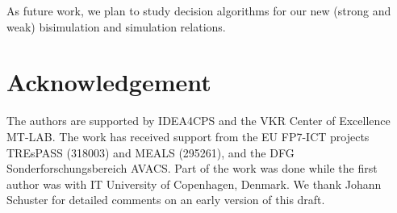 \documentclass{LMCS}
\begin{document}
As future work, we plan to study decision algorithms for our new
(strong and weak) bisimulation and simulation relations.

\section*{Acknowledgement}
The authors are supported by IDEA4CPS and the VKR Center of Excellence  MT-LAB. The work has received support from the EU FP7-ICT projects TREsPASS (318003) and MEALS (295261), and the DFG Sonderforschungsbereich AVACS. Part of the work was done while the first author was with IT University of Copenhagen, Denmark. We thank Johann Schuster for detailed comments on an early version of this draft.



\end{document}
